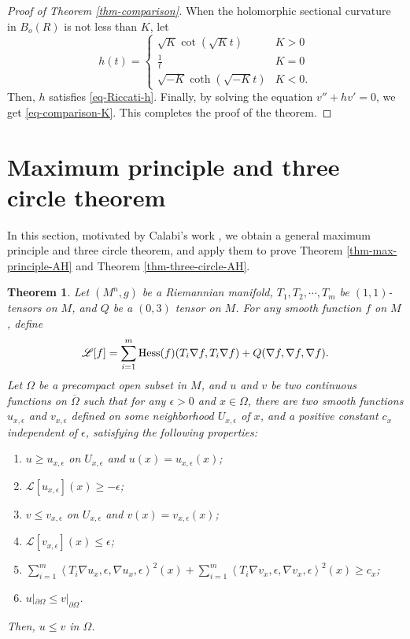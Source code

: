 \documentclass[12pt]{amsart}
\def\ol{\overline}
\def\e{\epsilon}
\def\p{\partial}
\def\ol{\overline}
\def\vv<#1,#2>{\left\langle#1,#2\right\rangle}
\newtheorem{thm}{Theorem}[section]
\theoremstyle{definition}
\theoremstyle{remark}
\numberwithin{equation}{section}
\def\Hess{{\rm Hess}}
\begin{document}
\begin{proof}[Proof of Theorem \ref{thm-comparison}]
When the holomorphic sectional curvature in $B_o(R)$ is not less than $K$, let
\begin{equation}
h(t)=\left\{\begin{array}{cl}\sqrt K\cot(\sqrt K t)&K>0\\
\frac1t&K=0\\
\sqrt{-K}\coth(\sqrt{-K}t)&K<0.
\end{array}\right.
\end{equation}
Then, $h$ satisfies \eqref{eq-Riccati-h}. Finally, by solving the equation $v''+hv'=0$, we get \eqref{eq-comparison-K}. This completes the proof of the theorem.
\end{proof}

\section{Maximum principle and three circle theorem}
In this section, motivated by Calabi's work \cite{Ca}, we obtain a general maximum principle and three circle theorem, and apply them to prove Theorem \ref{thm-max-principle-AH} and Theorem \ref{thm-three-circle-AH}.
\begin{thm}\label{thm-max-principle}
Let $(M^n,g)$ be a Riemannian manifold, $T_1,T_2,\cdots, T_m$ be $(1,1)$-tensors on $M$, and $Q$ be a $(0,3)$ tensor on $M$. For any smooth function $f$ on $M$, define
\begin{equation}
\mathscr{L}[f]=\sum_{i=1}^m\Hess(f)(T_i\nabla f,T_i\nabla f)+Q(\nabla f,\nabla f,\nabla f).
\end{equation}
Let $\Omega$ be a precompact open subset in $M$, and $u$ and $v$ be two continuous functions on $\ol\Omega$ such that for any $\e>0$ and $x\in \Omega$, there are two smooth functions $u_{x,\e}$ and $v_{x,\e}$ defined on some neighborhood $U_{x,\e}$ of $x$, and a positive constant $c_x$ independent of $\e$, satisfying the following properties:
\begin{enumerate}
\item $u\geq u_{x,\e}$ on $U_{x,\e}$ and $u(x)=u_{x,\e}(x)$;
\item $\mathscr{L}[u_{x,\e}](x)\geq-\e$;
\item $v\leq v_{x,\e}$ on $U_{x,\e}$ and $v(x)=v_{x,\e}(x)$;
\item $\mathscr{L}[v_{x,\e}](x)\leq \e$;
\item $\sum_{i=1}^m\vv<T_i\nabla u_{x,\e},\nabla u_{x,\e}>^2(x)+\sum_{i=1}^m\vv<T_i\nabla v_{x,\e},\nabla v_{x,\e}>^2(x)\geq c_x$;
\item $u|_{\p\Omega}\leq v|_{\p\Omega}$.
\end{enumerate}
Then, $u\leq v$ in $\Omega$.
\end{thm}
\end{document}
